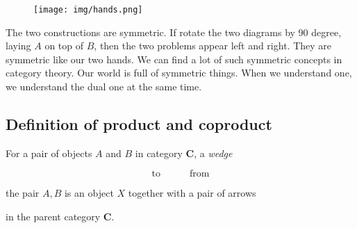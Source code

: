 \documentclass{article}
\begin{document}
\begin{center}
\end{center}

\begin{figure}[htbp]
 \centering
 \texttt{[image: img/hands.png]}
 \captionsetup{labelformat=empty}
 \caption{}
 \label{fig:hands}
\end{figure}

The two constructions are symmetric. If rotate the two diagrams by 90 degree, laying $A$ on top of $B$, then the two problems appear left and right. They are symmetric like our two hands. We can find a lot of such symmetric concepts in category theory. Our world is full of symmetric things. When we understand one, we understand the dual one at the same time.

\subsection{Definition of product and coproduct}
 
\begin{definition}
\normalfont
For a pair of objects $A$ and $B$ in category $\pmb{C}$, a {\em wedge}

\[
\text{to} \quad \quad \quad \text{from}
\]

the pair $A, B$ is an object $X$ together with a pair of arrows

\begin{center}
\end{center}

in the parent category $\pmb{C}$.
\end{definition}
\end{document}
